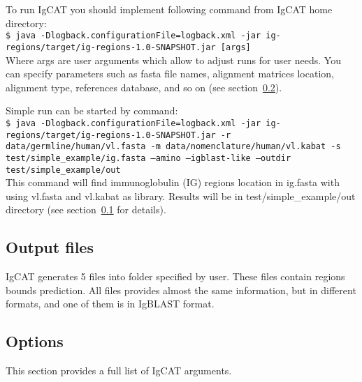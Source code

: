 \documentclass{scrartcl}
\newcommand{\shellcmd}[1]{\\\indent\indent\texttt{\footnotesize #1}\\}
\begin{document}
To run IgCAT you should implement following command from IgCAT home directory:
\shellcmd{\$ java -Dlogback.configurationFile=logback.xml -jar
ig-regions/target/ig-regions-1.0-SNAPSHOT.jar [args]}
Where args are user arguments which allow to adjust runs for user needs.
You can specify parameters such as fasta file names, alignment matrices location,
alignment type, references database, and so on (see section~\ref{subsec:options}).

Simple run can be started by command:
\shellcmd{\$ java -Dlogback.configurationFile=logback.xml
-jar ig-regions/target/ig-regions-1.0-SNAPSHOT.jar -r data/germline/human/vl.fasta
-m data/nomenclature/human/vl.kabat -s test/simple\_example/ig.fasta --amino --igblast-like
--outdir test/simple\_example/out}
This command will find immunoglobulin (IG) regions location in ig.fasta with using vl.fasta and vl.kabat as library.
Results will be in test/simple\_example/out directory (see section~\ref{subsec:files} for details).

\subsection{Output files}
\label{subsec:files}
IgCAT generates 5 files into folder specified by user.
These files contain regions bounds prediction.
All files provides almost the same information, but in different formats,
and one of them is in IgBLAST format\cite{Ye2013}.


\subsection{Options}
\label{subsec:options}
This section provides a full list of IgCAT arguments.
\end{document}
